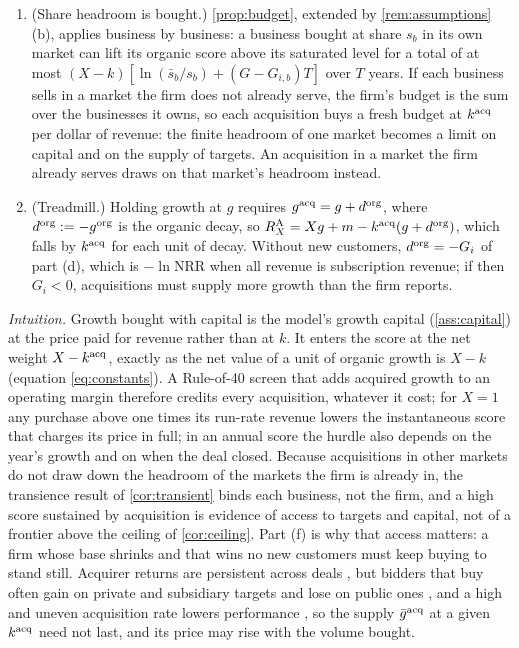 \begin{proposition}
\begin{enumerate}
\item[(e)] (Share headroom is bought.) \autoref{prop:budget}, extended by \autoref{rem:assumptions}(b), applies business by business: a business bought at share $s_b$ in its own market can lift its organic score above its saturated level for a total of at most $(X-k)[\ln(\bar s_b/s_b)+(G-G_{i,b})T]$ over $T$ years. If each business sells in a market the firm does not already serve, the firm's budget is the sum over the businesses it owns, so each acquisition buys a fresh budget at $k^{\rm acq}$ per dollar of revenue: the finite headroom of one market becomes a limit on capital and on the supply of targets. An acquisition in a market the firm already serves draws on that market's headroom instead.
\item[(f)] (Treadmill.) Holding growth at $g$ requires $g^{\rm acq}=g+d^{\rm org}$, where $d^{\rm org}:=-g^{\rm org}$ is the organic decay, so $R^{\rm A}_X=Xg+m-k^{\rm acq}(g+d^{\rm org})$, which falls by $k^{\rm acq}$ for each unit of decay. Without new customers, $d^{\rm org}=-G_i$ of part (d), which is $-\ln\mathrm{NRR}$ when all revenue is subscription revenue; if then $G_i<0$, acquisitions must supply more growth than the firm reports.
\end{enumerate}
\end{proposition}

\noindent\emph{Intuition.} Growth bought with capital is the model's growth capital (\autoref{ass:capital}) at the price paid for revenue rather than at $k$. It enters the score at the net weight $X-k^{\rm acq}$, exactly as the net value of a unit of organic growth is $X-k$ (equation \eqref{eq:constants}). A Rule-of-40 screen that adds acquired growth to an operating margin therefore credits every acquisition, whatever it cost; for $X=1$ any purchase above one times its run-rate revenue lowers the instantaneous score that charges its price in full; in an annual score the hurdle also depends on the year's growth and on when the deal closed. Because acquisitions in other markets do not draw down the headroom of the markets the firm is already in, the transience result of \autoref{cor:transient} binds each business, not the firm, and a high score sustained by acquisition is evidence of access to targets and capital, not of a frontier above the ceiling of \autoref{cor:ceiling}. Part (f) is why that access matters: a firm whose base shrinks and that wins no new customers must keep buying to stand still. Acquirer returns are persistent across deals \citep{golubov2015extraordinary}, but bidders that buy often gain on private and subsidiary targets and lose on public ones \citep{fuller2002what}, and a high and uneven acquisition rate lowers performance \citep{laamanen2008performance}, so the supply $\bar g^{\rm acq}$ at a given $k^{\rm acq}$ need not last, and its price may rise with the volume bought.

